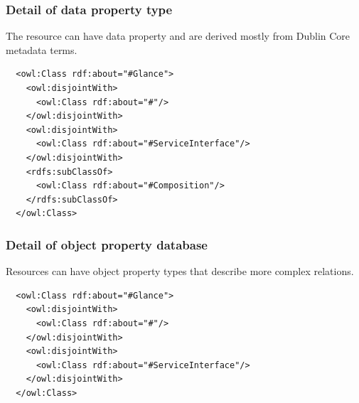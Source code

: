 \subsubsection{Detail of data property type}

The resource can have data property and are derived mostly from Dublin Core metadata terms.

\begin{lstlisting}
  <owl:Class rdf:about="#Glance">
    <owl:disjointWith>
      <owl:Class rdf:about="#"/>
    </owl:disjointWith>
    <owl:disjointWith>
      <owl:Class rdf:about="#ServiceInterface"/>
    </owl:disjointWith>
    <rdfs:subClassOf>
      <owl:Class rdf:about="#Composition"/>
    </rdfs:subClassOf>
  </owl:Class>
\end{lstlisting}

\subsubsection{Detail of object property database}

Resources can have object property types that describe more complex relations. 

\begin{lstlisting}
  <owl:Class rdf:about="#Glance">
    <owl:disjointWith>
      <owl:Class rdf:about="#"/>
    </owl:disjointWith>
    <owl:disjointWith>
      <owl:Class rdf:about="#ServiceInterface"/>
    </owl:disjointWith>
  </owl:Class>
\end{lstlisting}
